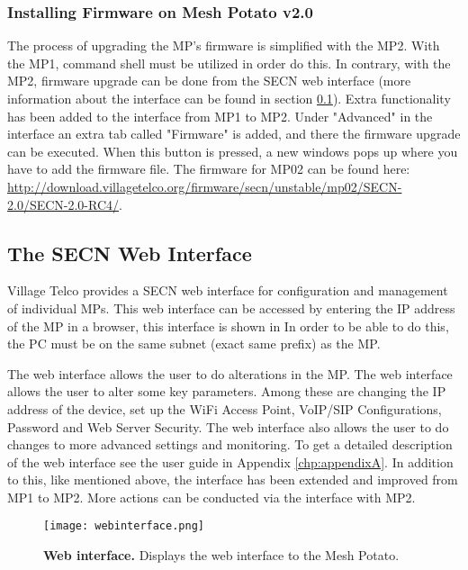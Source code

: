 \subsubsection{Installing Firmware on Mesh Potato v2.0}
The process of upgrading the MP's firmware is simplified with the MP2. With the MP1, command shell must be utilized in order do this. In contrary, with the MP2, firmware upgrade can be done from the SECN web interface (more information about the interface can be found in section \ref{subsec:interface}). Extra functionality has been added to the interface from MP1 to MP2. Under "Advanced" in the interface an extra tab called "Firmware" is added, and there the firmware upgrade can be executed. When this button is pressed, a new windows pops up where you have to add the firmware file. The firmware for MP02 can be found here: \url{http://download.villagetelco.org/firmware/secn/unstable/mp02/SECN-2.0/SECN-2.0-RC4/}.

\subsection{The SECN Web Interface}
\label{subsec:interface}
Village Telco provides a SECN web interface for configuration and management of individual MPs. This web interface can be accessed by entering the IP address of the MP in a browser, this interface is shown in  In order to be able to do this, the PC must be on the same subnet (exact same prefix) as the MP.  

The web interface allows the user to do alterations in the MP. The web interface allows the user to alter some key parameters. Among these are changing the IP address of the device, set up the WiFi Access Point, VoIP/SIP Configurations, Password and Web Server Security. The web interface also allows the user to do changes to more advanced settings and monitoring. To get a detailed description of the web interface see the user guide in Appendix \ref{chp:appendixA}. In addition to this, like mentioned above, the interface has been extended and improved from MP1 to MP2. More actions can be conducted via the interface with MP2. 

\begin{figure}[t]
  \centering
      \texttt{[image: webinterface.png]}
  \caption [Web interface]{\textbf{Web interface.} Displays the web interface to the Mesh Potato.}
  \label{fig:webinterface}
\end{figure}

